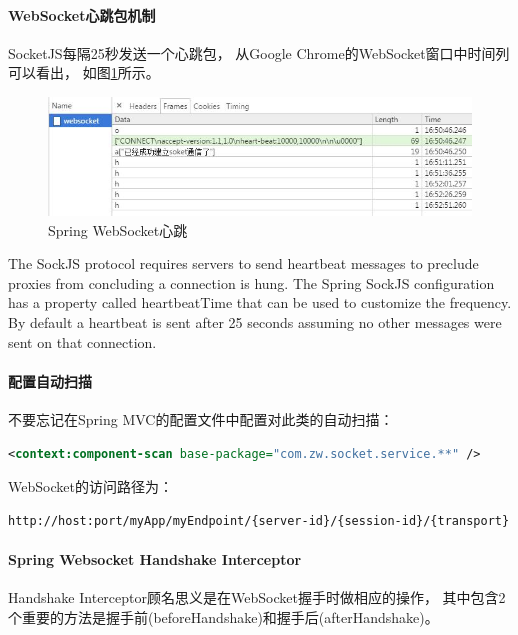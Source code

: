 \documentclass{book}
\begin{document}
\paragraph{WebSocket心跳包机制}

SocketJS每隔25秒发送一个心跳包，
从Google Chrome的WebSocket窗口中时间列可以看出，
如图\ref{fig:WebSocketHeartbeat}所示。

\begin{figure}[htbp]
	\centering
	\includegraphics[scale=0.5]{WebSocketHeartbeat.jpg}
	\caption{Spring WebSocket心跳}
	\label{fig:WebSocketHeartbeat}
\end{figure}

The SockJS protocol requires servers to send heartbeat messages 
to preclude proxies from concluding a connection is hung. 
The Spring SockJS configuration has a property called heartbeatTime that can be used to customize the frequency. 
By default a heartbeat is sent after 25 seconds assuming no other messages were sent on that connection. 

\paragraph{配置自动扫描}

不要忘记在Spring MVC的配置文件中配置对此类的自动扫描：

\begin{lstlisting}[language=XML]
<context:component-scan base-package="com.zw.socket.service.**" />
\end{lstlisting}

WebSocket的访问路径为：

\begin{lstlisting}[language=HTML]
http://host:port/myApp/myEndpoint/{server-id}/{session-id}/{transport}
\end{lstlisting}

\paragraph{Spring Websocket Handshake Interceptor}

Handshake Interceptor顾名思义是在WebSocket握手时做相应的操作，
其中包含2个重要的方法是握手前(beforeHandshake)和握手后(afterHandshake)。
\end{document}
